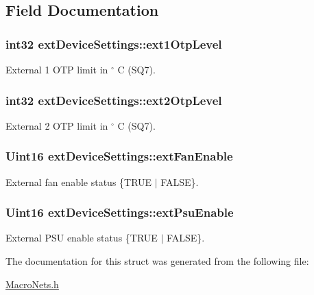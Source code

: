 \subsection{Field Documentation}
\hypertarget{a00005_a7cf62224e015e717460215641dc3e93e}{
\subsubsection[{ext1\-Otp\-Level}]{\setlength{\rightskip}{0pt plus 5cm}int32 ext\-Device\-Settings\-::ext1\-Otp\-Level}}\label{a00005_a7cf62224e015e717460215641dc3e93e}
External 1 O\-T\-P limit in $ ^\circ$ C (S\-Q7). \hypertarget{a00005_aa4bded0306eb752974a7f60cf87f24b2}{
\subsubsection[{ext2\-Otp\-Level}]{\setlength{\rightskip}{0pt plus 5cm}int32 ext\-Device\-Settings\-::ext2\-Otp\-Level}}\label{a00005_aa4bded0306eb752974a7f60cf87f24b2}
External 2 O\-T\-P limit in $ ^\circ$ C (S\-Q7). \hypertarget{a00005_a32ea51e444d99ee6231d10519650daec}{
\subsubsection[{ext\-Fan\-Enable}]{\setlength{\rightskip}{0pt plus 5cm}Uint16 ext\-Device\-Settings\-::ext\-Fan\-Enable}}\label{a00005_a32ea51e444d99ee6231d10519650daec}
External fan enable status \{T\-R\-U\-E $|$ F\-A\-L\-S\-E\}. \hypertarget{a00005_a35d06fe7472dbf3f7b2505e86337c497}{
\subsubsection[{ext\-Psu\-Enable}]{\setlength{\rightskip}{0pt plus 5cm}Uint16 ext\-Device\-Settings\-::ext\-Psu\-Enable}}\label{a00005_a35d06fe7472dbf3f7b2505e86337c497}
External P\-S\-U enable status \{T\-R\-U\-E $|$ F\-A\-L\-S\-E\}. 

The documentation for this struct was generated from the following file\-:\begin{DoxyCompactItemize}
\item 
\hyperlink{a00027}{Macro\-Nets.\-h}\end{DoxyCompactItemize}
